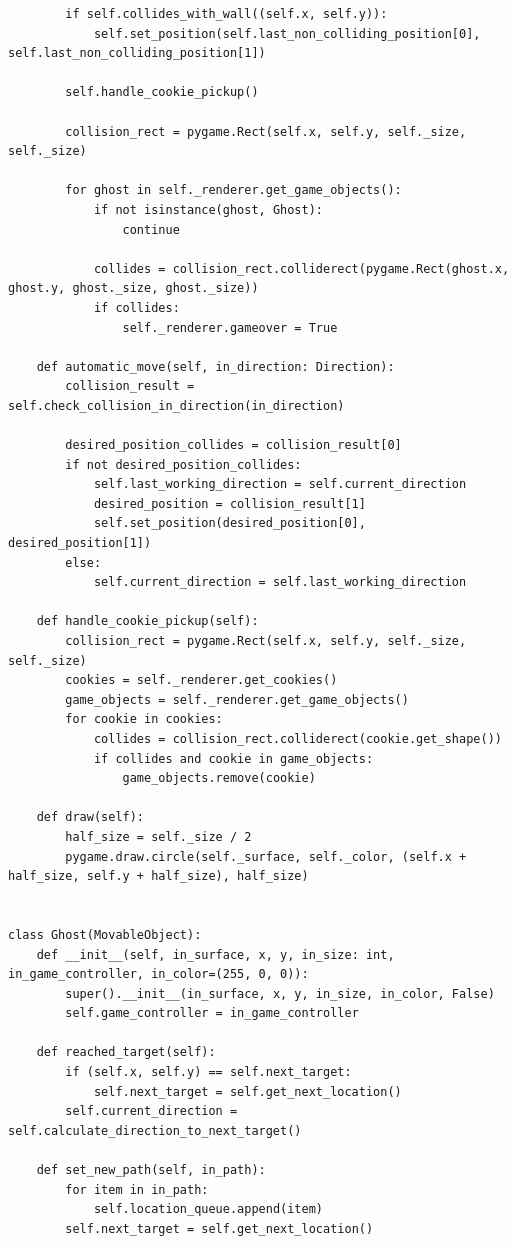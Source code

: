 \documentclass[a4paper,14pt]{extarticle}
\begin{document}
\begin{verbatim}
        if self.collides_with_wall((self.x, self.y)):
            self.set_position(self.last_non_colliding_position[0], self.last_non_colliding_position[1])

        self.handle_cookie_pickup()

        collision_rect = pygame.Rect(self.x, self.y, self._size, self._size)

        for ghost in self._renderer.get_game_objects():
            if not isinstance(ghost, Ghost):
                continue

            collides = collision_rect.colliderect(pygame.Rect(ghost.x, ghost.y, ghost._size, ghost._size))
            if collides:
                self._renderer.gameover = True

    def automatic_move(self, in_direction: Direction):
        collision_result = self.check_collision_in_direction(in_direction)

        desired_position_collides = collision_result[0]
        if not desired_position_collides:
            self.last_working_direction = self.current_direction
            desired_position = collision_result[1]
            self.set_position(desired_position[0], desired_position[1])
        else:
            self.current_direction = self.last_working_direction

    def handle_cookie_pickup(self):
        collision_rect = pygame.Rect(self.x, self.y, self._size, self._size)
        cookies = self._renderer.get_cookies()
        game_objects = self._renderer.get_game_objects()
        for cookie in cookies:
            collides = collision_rect.colliderect(cookie.get_shape())
            if collides and cookie in game_objects:
                game_objects.remove(cookie)

    def draw(self):
        half_size = self._size / 2
        pygame.draw.circle(self._surface, self._color, (self.x + half_size, self.y + half_size), half_size)


class Ghost(MovableObject):
    def __init__(self, in_surface, x, y, in_size: int, in_game_controller, in_color=(255, 0, 0)):
        super().__init__(in_surface, x, y, in_size, in_color, False)
        self.game_controller = in_game_controller

    def reached_target(self):
        if (self.x, self.y) == self.next_target:
            self.next_target = self.get_next_location()
        self.current_direction = self.calculate_direction_to_next_target()

    def set_new_path(self, in_path):
        for item in in_path:
            self.location_queue.append(item)
        self.next_target = self.get_next_location()


\end{verbatim}
\end{document}
